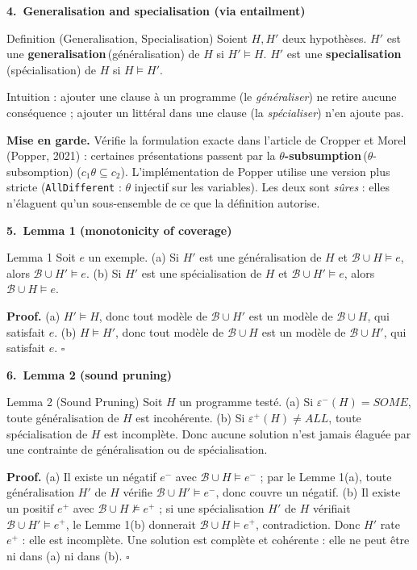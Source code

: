\documentclass[10pt]{article}
\newcommand{\EN}[2]{\textbf{#1}\,{\scriptsize\textcolor{marine}{(#2)}}}
\newcommand{\titrebox}[2]{\needspace{10\baselineskip}\vspace{8pt}
  \begin{tcolorbox}[colback=marine, colframe=marine, arc=0pt, boxrule=0pt,
    top=4pt, bottom=4pt, left=8pt]
  \color{white}\Large\bfseries #1.~#2
  \end{tcolorbox}\vspace{2pt}}
\begin{document}
\titrebox{4}{Generalisation and specialisation (via entailment)}
\begin{enonce}{Definition (Generalisation, Specialisation)}
Soient $H,H'$ deux hypothèses. $H'$ est une \EN{generalisation}{généralisation} de $H$ si $H'\models H$.
$H'$ est une \EN{specialisation}{spécialisation} de $H$ si $H\models H'$.
\end{enonce}
Intuition : ajouter une clause à un programme (le \emph{généraliser}) ne retire aucune conséquence ; ajouter un littéral dans une clause (la \emph{spécialiser})
n'en ajoute pas.\par\vspace{2pt}
\textbf{Mise en garde.} Vérifie la formulation exacte dans l'article de Cropper et Morel (Popper, 2021) : certaines présentations passent par la
\EN{$\theta$-subsumption}{$\theta$-subsomption} ($c_1\theta\subseteq c_2$). L'implémentation de Popper utilise une version plus stricte (\texttt{AllDifferent} : $\theta$ injectif sur les variables).
Les deux sont \emph{sûres} : elles n'élaguent qu'un sous-ensemble de ce que la définition autorise.

\titrebox{5}{Lemma 1 (monotonicity of coverage)}
\begin{enonce}{Lemma 1}
Soit $e$ un exemple. (a) Si $H'$ est une généralisation de $H$ et $\mathcal{B}\cup H\models e$, alors $\mathcal{B}\cup H'\models e$.
(b) Si $H'$ est une spécialisation de $H$ et $\mathcal{B}\cup H'\models e$, alors $\mathcal{B}\cup H\models e$.
\end{enonce}
\textbf{Proof.} (a) $H'\models H$, donc tout modèle de $\mathcal{B}\cup H'$ est un modèle de $\mathcal{B}\cup H$, qui satisfait $e$.
(b) $H\models H'$, donc tout modèle de $\mathcal{B}\cup H$ est un modèle de $\mathcal{B}\cup H'$, qui satisfait $e$. \hfill $\square$

\titrebox{6}{Lemma 2 (sound pruning)}
\begin{enonce}{Lemma 2 (Sound Pruning)}
Soit $H$ un programme testé. (a) Si $\varepsilon^-(H)=\mathit{SOME}$, toute généralisation de $H$ est incohérente. (b) Si $\varepsilon^+(H)\neq\mathit{ALL}$, toute spécialisation de $H$ est incomplète.
Donc aucune solution n'est jamais élaguée par une contrainte de généralisation ou de spécialisation.
\end{enonce}
\textbf{Proof.} (a) Il existe un négatif $e^-$ avec $\mathcal{B}\cup H\models e^-$ ; par le Lemme 1(a), toute généralisation $H'$ de $H$ vérifie $\mathcal{B}\cup H'\models e^-$, donc couvre un négatif.
(b) Il existe un positif $e^+$ avec $\mathcal{B}\cup H\not\models e^+$ ; si une spécialisation $H'$ de $H$ vérifiait $\mathcal{B}\cup H'\models e^+$, le Lemme 1(b) donnerait $\mathcal{B}\cup H\models e^+$, contradiction. Donc $H'$ rate $e^+$ : elle est incomplète.
Une solution est complète et cohérente : elle ne peut être ni dans (a) ni dans (b). \hfill $\square$
\end{document}
